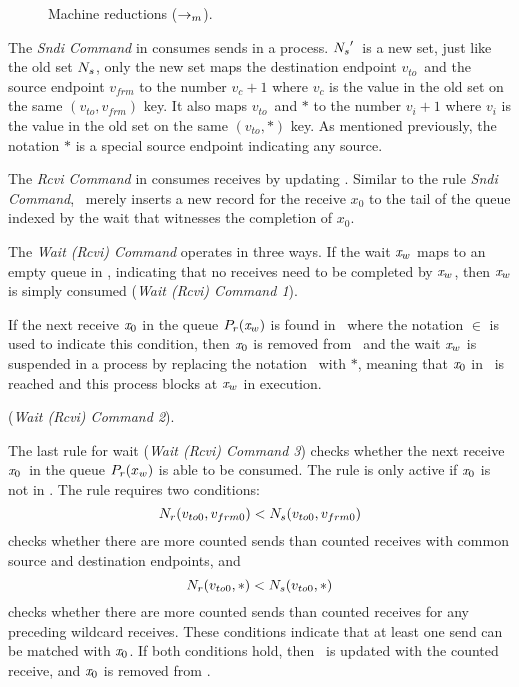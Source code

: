 \begin{figure*}[tb]
{}
\caption{Machine reductions ($\rightarrow_{m}$). }
\label{fig:machine}
\end{figure*}

The \emph{Sndi Command} in  consumes sends in a process. 
$\textit{$N_s$}^\prime$\ is a new set, just like the old set $\textit{$N_s$}$, only the new set maps the destination
endpoint $v_{to}$\ and the source endpoint $v_{frm}$ to the number $v_c + 1$ where $v_c$ is the value in the old set on the same $(v_{to},v_{frm})$ key. 
It also maps $v_{to}$\ and $\ast$ to the number $v_i + 1$ where $v_i$ is the value in the old set on the same $(v_{to},\ast)$ key. As mentioned previously, the notation $\ast$ is a special source endpoint indicating any source.

The \emph{Rcvi Command} in  consumes receives by updating \epwait. 
Similar to the rule \emph{Sndi Command}, \epwait\ merely inserts a new record for the receive $x_0$ to the tail of the queue indexed by the 
wait that witnesses the completion of $x_0$.

The \emph{Wait (Rcvi) Command} operates in three ways. 
If the wait $\mathit{x}_w$ maps to an empty queue in \epwait, indicating that no receives need to be completed by $\mathit{x}_w$, then $\mathit{x}_w$ is simply consumed (\emph{Wait (Rcvi) Command 1}). 

If the next receive $\mathit{x}_0$ in the queue $\textit{$P_r$}(\mathit{x}_w)$ is found in \rcvp\ where the notation $\in$ is used to indicate this condition, then $\mathit{x}_0$ is removed from \rcvp\ and the wait $\mathit{x}_w$ is suspended in a process by replacing the notation \wait\ with $\ast$\wait, meaning that $\mathit{x}_0$ in \rcvp\ is reached and this process blocks at $\mathit{x}_w$ in execution.

(\emph{Wait (Rcvi) Command 2}). 

The last rule for wait (\emph{Wait (Rcvi) Command 3}) checks whether the next receive $\mathit{x}_0$\ in the queue $\textit{$P_r$}(x_w)$ is able to be consumed. The rule is only active if $\mathit{x}_0$ is not in \rcvp. The rule requires two conditions: 
\[\textit{$N_r$}(v_{to0},v_{frm0}) < \textit{$N_s$}(v_{to0},v_{frm0})\]
checks whether there are more counted sends than counted receives with common source and destination endpoints,
and 
\[\textit{$N_r$}(v_{to0},\ast) < \textit{$N_s$}(v_{to0},\ast)\]
checks whether there are more counted sends than counted receives for any preceding wildcard receives. These conditions indicate that at least one send can be matched with $\mathit{x}_0$. If both conditions hold, then \eprcv\ is updated with the counted receive, and $\mathit{x}_0$ is removed from \epwait. 

